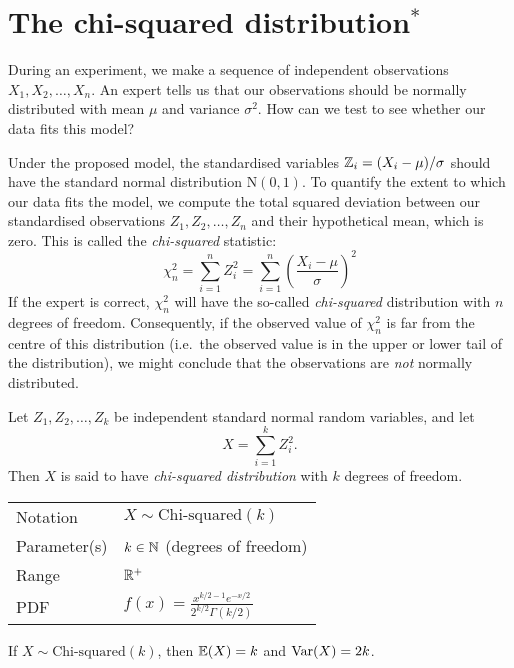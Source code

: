 \newpage
\section{The chi-squared distribution$^{*}$}
During an experiment, we make a sequence of independent observations $X_1,X_2,\ldots,X_n$. An expert tells us that our observations should be normally distributed with mean $\mu$ and variance $\sigma^2$. How can we test to see whether our data fits this model?

Under the proposed model, the standardised variables $\mathbb{Z}_i = (X_i-\mu)/\sigma$ should have the standard normal distribution $\text{N}(0,1)$. To quantify the extent to which our data fits the model, we compute the total squared deviation between our standardised observations $Z_1,Z_2,\ldots,Z_n$ and their hypothetical mean, which is zero. This is called the \emph{chi-squared} statistic:
\[
\chi^2_n = \sum_{i=1}^n Z_i^2 = \sum_{i=1}^n \left(\frac{X_i-\mu}{\sigma}\right)^2
\]
If the expert is correct, $\chi^2_n$ will have the so-called \emph{chi-squared} distribution with $n$ degrees of freedom. Consequently, if the observed value of $\chi^2_n$ is far from the centre of this distribution (i.e.\ the observed value is in the upper or lower tail of the distribution), we might conclude that the observations are \emph{not} normally distributed.

Let $Z_1,Z_2,\ldots,Z_k$ be independent standard normal random variables, and let
\[
\displaystyle X=\sum_{i=1}^k Z_i^2.
\]
Then $X$ is said to have \emph{chi-squared distribution} with $k$ degrees of freedom.

\begin{center}
\begin{tabular}{ll}\hline
Notation			& $X\sim\text{Chi-squared}(k)$ \\
Parameter(s)		& $k \in \mathbb{N}$ \quad (degrees of freedom) \\
Range			& $\mathbb{R}^{+}$ \\
PDF				& $f(x) = \displaystyle\frac{x^{k/2-1} e^{-x/2}}{2^{k/2}\Gamma(k/2)} $ \\[2ex] \hline
\end{tabular}
\end{center}


\begin{lemma}
If $X\sim\text{Chi-squared}(k)$, then $\mathbb{E}(X)= k$ and $\text{Var}(X) = 2k$.
\end{lemma}

